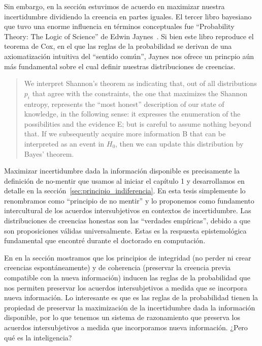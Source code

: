 \documentclass[a4paper,11pt]{book}
\theoremstyle{definition}
\begin{document}
Sin embargo, en la sección \emph{} estuvimos de acuerdo en maximizar nuestra incertidumbre dividiendo la creencia en partes iguales.
%
El tercer libro bayesiano que tuvo una enorme influencia en términos conceptuales fue ``Probability Theory: The Logic of Science'' de Edwin Jaynes~\cite{Jaynes2003}.
%
Si bien este libro reproduce el teorema de Cox, en el que las reglas de la probabilidad se derivan de una axiomatización intuitiva del ``sentido común'', Jaynes nos ofrece un princpio aún más fundamental sobre el cual definir nuestras distribuciones de creencias.
%
\begin{quotation}
We interpret Shannon's theorem as indicating that, out of all distributions $p_i$ that agree with the constraints, the one that maximizes the Shannon entropy, represents the ``most honest'' description of our state of knowledge, in the following sense: it expresses the enumeration of the possibilities and the evidence E; but is careful to assume nothing beyond that. If we subsequently acquire more information B that can be interpreted as an event in $H_0$, then we can update this distribution by Bayes' theorem. \cite{jaynes1984-bayesianBackground}
\end{quotation}
%
Maximizar incertidumbre dada la información disponible es precisamente la definición de no-mentir que usamos al iniciar el capítulo 1 y desarrollamos en detalle en la sección~\ref{sec:principio_indiferencia}.
%
En esta tesis simplemente lo renombramos como ``principio de no mentir'' y lo proponemos como fundamento intercultural de los acuerdos intersubjetivos en contextos de incertidumbre.
%
Las distribuciones de creencias honestas son las ``verdades empíricas'', debido a que son proposiciones válidas universalmente.
%
Estas es la respuesta epistemológica fundamental que encontré durante el doctorado en computación.


En en la sección \emph{} mostramos que los principios de integridad (no perder ni crear creencias espontáneamente) y de coherencia (preservar la creencia previa compatible con la nueva información) inducen las reglas de la probabilidad que nos permiten preservar los acuerdos intersubjetivos a medida que se incorpora nueva información.
%
Lo interesante es que es las reglas de la probabilidad tienen la propiedad de preservar la maximización de la incertidumbre dada la información disponible, por lo que tenemos un sistema de razonamiento que preserva los acuerdos intersubjetivos a medida que incorporamos nueva información.
%
¿Pero qué es la inteligencia?
\end{document}
